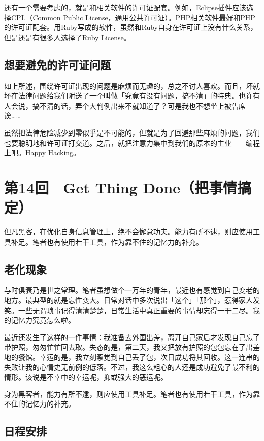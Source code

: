 \documentclass[a4paper,12pt]{article}
\begin{document}
还有一个需要考虑的，就是和相关软件的许可证配套。例如，Eclipse插件应该选择CPL（Common Public License，通用公共许可证）。PHP相关软件最好和PHP的许可证配套。用Ruby写成的软件，虽然和Ruby自身在许可证上没有什么关系，但是还是有很多人选择了Ruby License。

\subsection{想要避免的许可证问题}

如上所述，围绕许可证出现的问题是麻烦而无趣的，总之不讨人喜欢。而且，坏就坏在法律问题给我们附送了一个叫做「究竟有没有问题，搞不清」的特典。也许有人会说，搞不清的话，弄个大判例出来不就知道了？可是我也不想坐上被告席诶……

虽然把法律危险减少到零似乎是不可能的，但就是为了回避那些麻烦的问题，我们也要聪明地和许可证打交道。之后，就把注意力集中到我们的原本的主业——编程上吧。Happy Hacking。

\section{第14回　Get Thing Done（把事情搞定）}

但凡黑客，在优化自身信息管理上，绝不会懈怠功夫。能力有所不逮，则应使用工具补足。笔者也有使用若干工具，作为靠不住的记忆力的补充。

\subsection{老化现象}

与时俱衰乃是世之常理。笔者虽想做个一万年的青年，最近也有感觉到自己变老的地方。最典型的就是忘性变大。日常对话中多次说出「这个」「那个」，惹得家人发笑。一些无谓琐事记得清清楚楚，日常生活中真正重要的事情却忘得一干二尽。我的记忆力究竟怎么啦。

最近还发生了这样的一件事情：我准备去外国出差，离开自己家后才发现自己忘了带护照，匆匆忙忙回去取。失态的是，第二天，我又把放有护照的包包忘在了出差地的餐馆。幸运的是，我立刻察觉到自己丢了包，次日成功将其回收。这一连串的失败让我的心情史无前例的低落。不过，我这么粗心的人还是成功避免了最不利的情形。该说是不幸中的幸运呢，抑或强大的恶运呢。

身为黑客者，能力有所不逮，则应使用工具补足。笔者也有使用若干工具，作为靠不住的记忆力的补充。

\subsection{日程安排}
\end{document}

